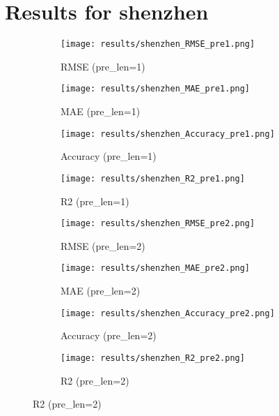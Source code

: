 \documentclass{article}
\begin{document}
\section*{Results for shenzhen}
\begin{figure}[htbp]
    \centering
    \begin{subfigure}[b]{0.24\textwidth}
        \texttt{[image: results/shenzhen\_RMSE\_pre1.png]}
        \caption{RMSE (pre\_len=1)}
    \end{subfigure}
    \begin{subfigure}[b]{0.24\textwidth}
        \texttt{[image: results/shenzhen\_MAE\_pre1.png]}
        \caption{MAE (pre\_len=1)}
    \end{subfigure}
    \begin{subfigure}[b]{0.24\textwidth}
        \texttt{[image: results/shenzhen\_Accuracy\_pre1.png]}
        \caption{Accuracy (pre\_len=1)}
    \end{subfigure}
    \begin{subfigure}[b]{0.24\textwidth}
        \texttt{[image: results/shenzhen\_R2\_pre1.png]}
        \caption{R2 (pre\_len=1)}
    \end{subfigure}

    \begin{subfigure}[b]{0.24\textwidth}
        \texttt{[image: results/shenzhen\_RMSE\_pre2.png]}
        \caption{RMSE (pre\_len=2)}
    \end{subfigure}
    \begin{subfigure}[b]{0.24\textwidth}
        \texttt{[image: results/shenzhen\_MAE\_pre2.png]}
        \caption{MAE (pre\_len=2)}
    \end{subfigure}
    \begin{subfigure}[b]{0.24\textwidth}
        \texttt{[image: results/shenzhen\_Accuracy\_pre2.png]}
        \caption{Accuracy (pre\_len=2)}
    \end{subfigure}
    \begin{subfigure}[b]{0.24\textwidth}
        \texttt{[image: results/shenzhen\_R2\_pre2.png]}
        \caption{R2 (pre\_len=2)}
    \end{subfigure}


\end{figure}
\end{document}
